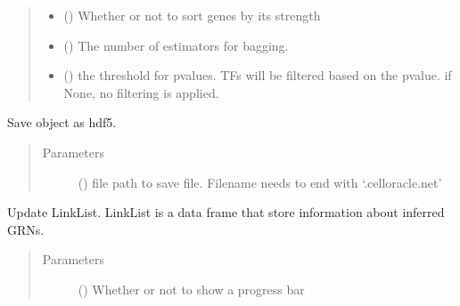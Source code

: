 \documentclass[letterpaper,10pt,english]{sphinxmanual}
\begin{document}
\begin{fulllineitems}
\begin{fulllineitems}
\begin{quote}
\begin{description}
\begin{itemize}
\item {} 
 () \textendash{} Whether or not to sort genes by its strength

\item {} 
 () \textendash{} The number of estimators for bagging.

\item {} 
 () \textendash{} the threshold for p\sphinxhyphen{}values. TFs will be filtered based on the p\sphinxhyphen{}value.
if None, no filtering is applied.

\end{itemize}

\end{description}\end{quote}

\end{fulllineitems}


\begin{fulllineitems}
\label{\detokenize{modules/celloracle:celloracle.Net.to_hdf5}}
Save object as hdf5.
\begin{quote}\begin{description}
\item[{Parameters}] \leavevmode
{} () \textendash{} file path to save file. Filename needs to end with ‘.celloracle.net’

\end{description}\end{quote}

\end{fulllineitems}


\begin{fulllineitems}
\label{\detokenize{modules/celloracle:celloracle.Net.updateLinkList}}
Update LinkList.
LinkList is a data frame that store information about inferred GRNs.
\begin{quote}\begin{description}
\item[{Parameters}] \leavevmode
{} () \textendash{} Whether or not to show a progress bar


\end{description}
\end{quote}
\end{fulllineitems}
\end{fulllineitems}
\end{document}
